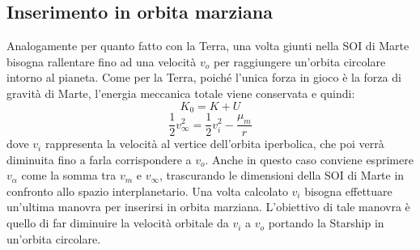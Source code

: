 \subsection{Inserimento in orbita marziana}
Analogamente per quanto fatto con la Terra, una volta giunti nella SOI di Marte bisogna rallentare fino ad una velocità $v_o$ per raggiungere un'orbita circolare intorno al pianeta.
Come per la Terra, poiché l'unica forza in gioco è la forza di gravità di Marte, l'energia meccanica totale viene conservata e quindi:
$$K_0 = K + U$$
\begin{equation}
    \label{Velocità marte}
    \frac{1}{2}v_\infty^2  = \frac{1}{2}v_i^2 - \frac{\mu_m}{r}
\end{equation}
dove $v_i$ rappresenta la velocità al vertice dell'orbita iperbolica, che poi verrà diminuita fino a farla corrispondere a $v_o$.
Anche in questo caso conviene esprimere $v_\alpha$ come la somma tra $v_m$ e $v_\infty$, trascurando le dimensioni della SOI di Marte in confronto allo spazio interplanetario.
Una volta calcolato $v_i$ bisogna effettuare un'ultima manovra per inserirsi in orbita marziana. L'obiettivo di tale manovra è quello di far diminuire la velocità orbitale da $v_i$ a $v_o$ portando la Starship in un'orbita circolare.
